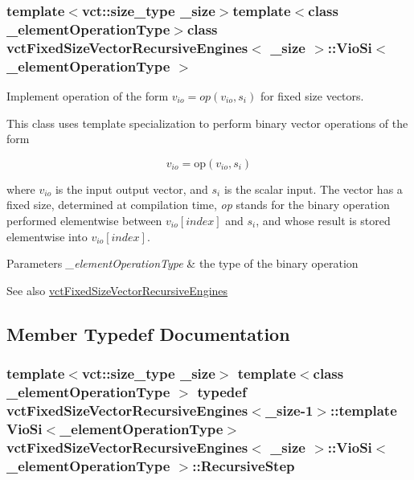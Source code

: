 \subsubsection*{template$<$vct\+::size\+\_\+type \+\_\+size$>$template$<$class \+\_\+element\+Operation\+Type$>$class vct\+Fixed\+Size\+Vector\+Recursive\+Engines$<$ \+\_\+size $>$\+::\+Vio\+Si$<$ \+\_\+element\+Operation\+Type $>$}

Implement operation of the form $ v_{io} = op(v_{io}, s_i)$ for fixed size vectors. 

This class uses template specialization to perform binary vector operations of the form

\[ v_{io} = \mathrm{op}(v_{io}, s_{i}) \]

where $v_{io}$ is the input output vector, and $s_{i}$ is the scalar input. The vector has a fixed size, determined at compilation time, {\itshape op} stands for the binary operation performed elementwise between $v_{io}[index]$ and $s_{i}$, and whose result is stored elementwise into $v_{io}[index]$.


\begin{DoxyParams}{Parameters}
{\em \+\_\+element\+Operation\+Type} & the type of the binary operation\\
\hline
\end{DoxyParams}
\begin{DoxySeeAlso}{See also}
\hyperlink{classvct_fixed_size_vector_recursive_engines}{vct\+Fixed\+Size\+Vector\+Recursive\+Engines} 
\end{DoxySeeAlso}


\subsection{Member Typedef Documentation}
\hypertarget{classvct_fixed_size_vector_recursive_engines_1_1_vio_si_aa8b9d5743826725a5da54114f23fea1e}{}
\subsubsection[{Recursive\+Step}]{\setlength{\rightskip}{0pt plus 5cm}template$<$vct\+::size\+\_\+type \+\_\+size$>$ template$<$class \+\_\+element\+Operation\+Type $>$ typedef {\bf vct\+Fixed\+Size\+Vector\+Recursive\+Engines}$<$\+\_\+size-\/1$>$\+::template {\bf Vio\+Si}$<$\+\_\+element\+Operation\+Type$>$ {\bf vct\+Fixed\+Size\+Vector\+Recursive\+Engines}$<$ \+\_\+size $>$\+::{\bf Vio\+Si}$<$ \+\_\+element\+Operation\+Type $>$\+::{\bf Recursive\+Step}}\label{classvct_fixed_size_vector_recursive_engines_1_1_vio_si_aa8b9d5743826725a5da54114f23fea1e}



